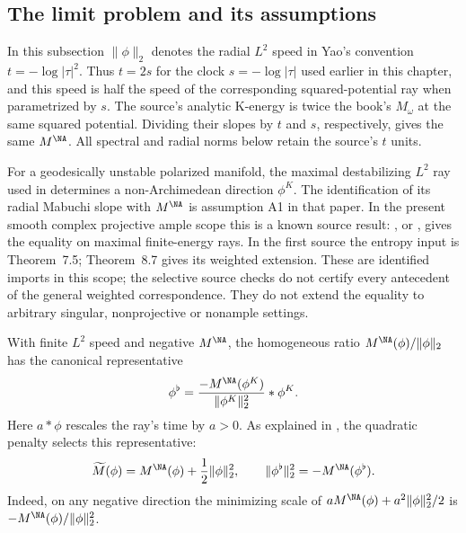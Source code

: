 \subsection{The limit problem and its assumptions}

In this subsection $\|\phi\|_2$ denotes the radial $L^2$ speed in
Yao's convention $t=-\log|\tau|^2$. Thus $t=2s$ for the clock
$s=-\log|\tau|$ used earlier in this chapter, and this speed is
half the speed of the corresponding squared-potential ray when
parametrized by $s$. The source's analytic K-energy is twice the
book's $M_\omega$ at the same squared potential. Dividing their
slopes by $t$ and $s$, respectively, gives the same $M^{\NA}$.
All spectral and radial norms below retain the source's $t$ units.

For a geodesically unstable polarized manifold, the maximal
destabilizing $L^2$ ray used in
\cite[Theorem~37 and Definition~39]{Yao25MaximalDestabilizers}
determines a non-Archimedean direction $\phi^K$. The identification
of its radial Mabuchi slope with $M^{\NA}$ is assumption A1 in that
paper. In the present smooth complex projective ample scope this
is a known source result: \cite[Theorem~C]{BJ25WeightedYTD}, or
\cite[Corollary~8.4 and equation~(14)]{DarvasZhang25YTD}, gives
the equality on maximal finite-energy rays. In the first source
the entropy input is Theorem~7.5; Theorem~8.7 gives its weighted
extension. These are identified imports in this scope; the
selective source checks do not certify every antecedent of the
general weighted correspondence. They do not extend the equality
to arbitrary singular, nonprojective or nonample settings.

With finite $L^2$ speed and negative $M^{\NA}$, the homogeneous
ratio $M^{\NA}(\phi)/\|\phi\|_2$ has the canonical representative
\[
 \phi^\flat=
 \frac{-M^{\NA}(\phi^K)}{\|\phi^K\|_2^2}*\phi^K.
\]
Here $a*\phi$ rescales the ray's time by $a>0$. As explained in
\cite[Proposition~44]{Yao25MaximalDestabilizers}, the quadratic
penalty selects this representative:
\[
 \widetilde M(\phi)=M^{\NA}(\phi)+\frac12\|\phi\|_2^2,
 \qquad
 \|\phi^\flat\|_2^2=-M^{\NA}(\phi^\flat).
\]
Indeed, on any negative direction the minimizing scale of
$aM^{\NA}(\phi)+a^2\|\phi\|_2^2/2$ is
$-M^{\NA}(\phi)/\|\phi\|_2^2$.

